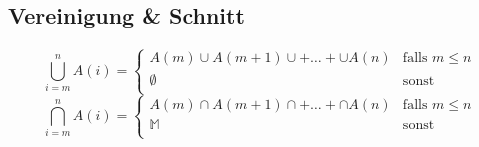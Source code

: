 \subsection{Vereinigung \& Schnitt}
$$\bigcup\limits_{i=m}^n A(i) = \left\lbrace \begin{array}{ll}
                                                 A(m) \cup A(m + 1) \cup + \dots + \cup A(n) & \textrm{falls } m \leq n \\
                                                 \emptyset                                   & \textrm{sonst}           \\
\end{array}  \right.$$
$$\bigcap\limits_{i=m}^n A(i) = \left\lbrace \begin{array}{ll}
                                                 A(m) \cap A(m + 1) \cap + \dots + \cap A(n) & \textrm{falls } m \leq n \\
                                                 \mathbb{M}                                  & \textrm{sonst}           \\
\end{array}  \right.$$
